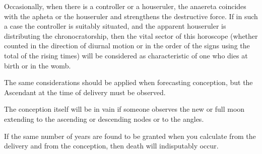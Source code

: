 Occasionally, when there is a controller or a houseruler, the anaereta coincides with the apheta or the houseruler and strengthens the destructive force. If in such a case the controller is suitably situated, and the apparent houseruler is distributing the chronocratorship, then the vital sector of this horoscope (whether counted in the direction of diurnal motion or in the order of the signs using the total of the rising times) will be considered as characteristic of one who dies at birth or in the womb. 

The same considerations should be applied when forecasting conception, but the Ascendant at the time of delivery must be observed. 

The conception itself will be in vain if someone observes the new or full moon extending to the ascending or descending nodes or to the angles. 

If the same number of years are found to be granted when you
calculate from the delivery and from the conception, then death will indisputably occur.

\newpage